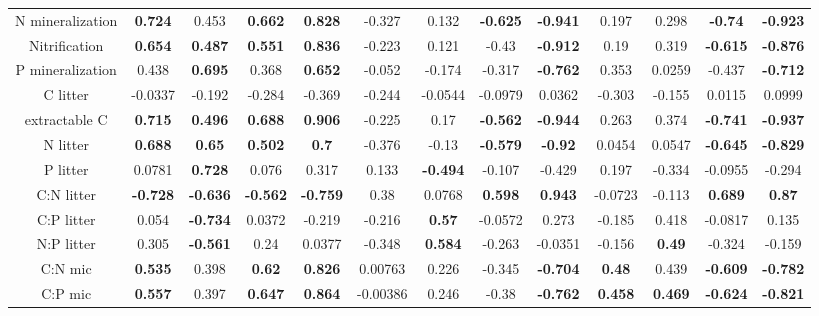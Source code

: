 \documentclass[authoryear,preprint,review,12pt]{elsarticle}
\begin{document}
\begin{landscape}
\begin{table}[h!]
\begin{center}
{\begin{tabular}{ccccccccccccc}
  N mineralization & \textbf{ 0.724 } & 0.453 & \textbf{ 0.662 } & \textbf{ 0.828 } & -0.327 & 0.132 & \textbf{ -0.625 } & \textbf{ -0.941 } & 0.197 & 0.298 & \textbf{ -0.74 } & \textbf{ -0.923 } \\ 
  Nitrification & \textbf{ 0.654 } & \textbf{ 0.487 } & \textbf{ 0.551 } & \textbf{ 0.836 } & -0.223 & 0.121 & -0.43 & \textbf{ -0.912 } & 0.19 & 0.319 & \textbf{ -0.615 } & \textbf{ -0.876 } \\ 
  P mineralization & 0.438 & \textbf{ 0.695 } & 0.368 & \textbf{ 0.652 } & -0.052 & -0.174 & -0.317 & \textbf{ -0.762 } & 0.353 & 0.0259 & -0.437 & \textbf{ -0.712 } \\ 
  C litter & -0.0337 & -0.192 & -0.284 & -0.369 & -0.244 & -0.0544 & -0.0979 & 0.0362 & -0.303 & -0.155 & 0.0115 & 0.0999 \\ 
  extractable C & \textbf{ 0.715 } & \textbf{ 0.496 } & \textbf{ 0.688 } & \textbf{ 0.906 } & -0.225 & 0.17 & \textbf{ -0.562 } & \textbf{ -0.944 } & 0.263 & 0.374 & \textbf{ -0.741 } & \textbf{ -0.937 } \\ 
  N litter & \textbf{ 0.688 } & \textbf{ 0.65 } & \textbf{ 0.502 } & \textbf{  0.7 } & -0.376 & -0.13 & \textbf{ -0.579 } & \textbf{ -0.92 } & 0.0454 & 0.0547 & \textbf{ -0.645 } & \textbf{ -0.829 } \\ 
  P litter & 0.0781 & \textbf{ 0.728 } & 0.076 & 0.317 & 0.133 & \textbf{ -0.494 } & -0.107 & -0.429 & 0.197 & -0.334 & -0.0955 & -0.294 \\ 
  C:N litter & \textbf{ -0.728 } & \textbf{ -0.636 } & \textbf{ -0.562 } & \textbf{ -0.759 } & 0.38 & 0.0768 & \textbf{ 0.598 } & \textbf{ 0.943 } & -0.0723 & -0.113 & \textbf{ 0.689 } & \textbf{ 0.87 } \\ 
  C:P litter & 0.054 & \textbf{ -0.734 } & 0.0372 & -0.219 & -0.216 & \textbf{ 0.57 } & -0.0572 & 0.273 & -0.185 & 0.418 & -0.0817 & 0.135 \\ 
  N:P litter & 0.305 & \textbf{ -0.561 } & 0.24 & 0.0377 & -0.348 & \textbf{ 0.584 } & -0.263 & -0.0351 & -0.156 & \textbf{ 0.49 } & -0.324 & -0.159 \\ 
  C:N mic & \textbf{ 0.535 } & 0.398 & \textbf{ 0.62 } & \textbf{ 0.826 } & 0.00763 & 0.226 & -0.345 & \textbf{ -0.704 } & \textbf{ 0.48 } & 0.439 & \textbf{ -0.609 } & \textbf{ -0.782 } \\ 
  C:P mic & \textbf{ 0.557 } & 0.397 & \textbf{ 0.647 } & \textbf{ 0.864 } & -0.00386 & 0.246 & -0.38 & \textbf{ -0.762 } & \textbf{ 0.458 } & \textbf{ 0.469 } & \textbf{ -0.624 } & \textbf{ -0.821 } \\ 

\end{tabular}}
\end{center}
\end{table}
\end{landscape}
\end{document}
